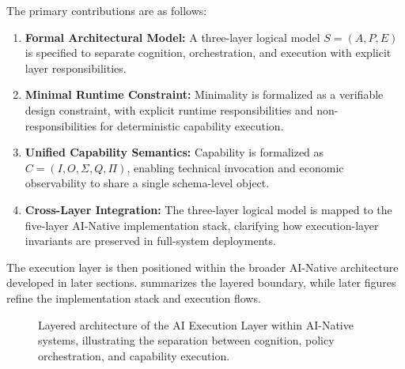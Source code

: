 The primary contributions are as follows:

\begin{enumerate}[leftmargin=1.5em]
    \item \textbf{Formal Architectural Model:} A three-layer logical model $S = (A, P, E)$ is specified to separate cognition, orchestration, and execution with explicit layer responsibilities.
    \item \textbf{Minimal Runtime Constraint:} Minimality is formalized as a verifiable design constraint, with explicit runtime responsibilities and non-responsibilities for deterministic capability execution.
    \item \textbf{Unified Capability Semantics:} Capability is formalized as $C = (I, O, \Sigma, Q, \Pi)$, enabling technical invocation and economic observability to share a single schema-level object.
    \item \textbf{Cross-Layer Integration:} The three-layer logical model is mapped to the five-layer AI-Native implementation stack, clarifying how execution-layer invariants are preserved in full-system deployments.
\end{enumerate}

The execution layer is then positioned within the broader AI-Native architecture developed in later sections.  summarizes the layered boundary, while later figures refine the implementation stack and execution flows.

\begin{figure}[t]
\centering
{}
\caption{Layered architecture of the AI Execution Layer within AI-Native systems, illustrating the separation between cognition, policy orchestration, and capability execution.}
\label{fig:layered-architecture-overview}
\end{figure}
